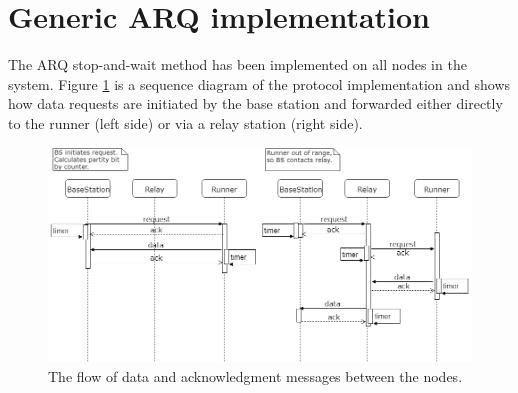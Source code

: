 \section{Generic ARQ implementation}\label{sc:overall}

The ARQ stop-and-wait method has been implemented on all nodes in the system. Figure \ref{fig:tohopornotarqsequence} is a sequence diagram of the  protocol implementation and shows how data requests are initiated by the base station and forwarded either directly to the runner  (left side) or via a relay station (right side).

\begin{figure}[H]
	\centering
	\includegraphics[width=1\linewidth]{implementation/overall/toHopOrNotArqSequence}
	\caption{The flow of data and acknowledgment messages between the nodes.}
	\label{fig:tohopornotarqsequence}
\end{figure}

